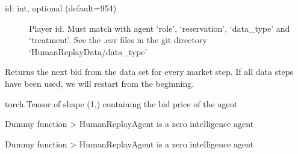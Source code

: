 \documentclass[letterpaper,10pt,english]{sphinxmanual}
\begin{document}
\begin{fulllineitems}
\begin{fulllineitems}
\begin{description}
\begin{description}
\item[{id: int, optional (default=954)}] \leavevmode
\sphinxAtStartPar
Player id. Must match with agent ‘role’, ‘reservation’, ‘data\_type’ and ‘treatment’.
See the .csv files in the git directory ‘HumanReplayData/data\_type’

\end{description}

\end{description}

\end{fulllineitems}


\begin{fulllineitems}
\label{\detokenize{MultiAgentMarketRL:agents.HumanReplayAgent.get_action}}
\sphinxAtStartPar
Returns the next bid from the data set for every market step. If all data steps have been used, we will restart
from the beginning.

\sphinxAtStartPar
torch.Tensor of shape (1,) containing the bid price of the agent

\end{fulllineitems}


\begin{fulllineitems}
\label{\detokenize{MultiAgentMarketRL:agents.HumanReplayAgent.get_q_value}}
\sphinxAtStartPar
Dummy function \textendash{}\textgreater{} HumanReplayAgent is a zero intelligence agent

\end{fulllineitems}


\begin{fulllineitems}
\label{\detokenize{MultiAgentMarketRL:agents.HumanReplayAgent.get_target}}
\sphinxAtStartPar
Dummy function \textendash{}\textgreater{} HumanReplayAgent is a zero intelligence agent


\end{fulllineitems}
\end{fulllineitems}
\end{document}
